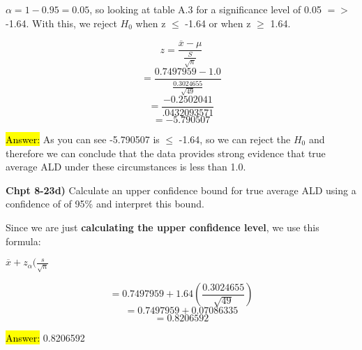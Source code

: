 \documentclass{article}
\begin{document}
$\alpha=1-0.95=0.05$, so looking at table A.3 for a significance level of 0.05 $=>$ -1.64. With this, we reject $H_{0}$ when z $\le$ -1.64 or when z $\ge$ 1.64.

\vspace{3mm}


$$z=\frac{\overline{x}-\mu}{\frac{S}{\sqrt{n}}}$$
$$=\frac{ 0.7497959-1.0}{\frac{0.3024655}{\sqrt{49}}}$$
$$=\frac{-0.2502041}{.0432093571}$$
$$=-5.790507$$
\vspace{3mm}

\hl{Answer:} As you can see -5.790507 is $\le$ -1.64, so we can reject the $H_{0}$ and therefore we can conclude that the data provides strong evidence that true average ALD under these circumstances is less than 1.0.

\vspace{3mm}

\textbf{Chpt 8-23d)} Calculate an upper confidence bound for true average ALD using a confidence of of 95\% and interpret this bound.

\vspace{2mm}

Since we are just \textbf{calculating the upper confidence level}, we use this formula: 

\vspace{2mm}

$\overline{x}+z_\alpha(\frac{s}{\sqrt{n}}$

\vspace{2mm}

$$=0.7497959+1.64(\frac{0.3024655}{\sqrt{49}})$$
$$=0.7497959+0.07086335$$
$$=0.8206592$$

\vspace{2mm}

\hl{Answer:} 0.8206592
\end{document}
